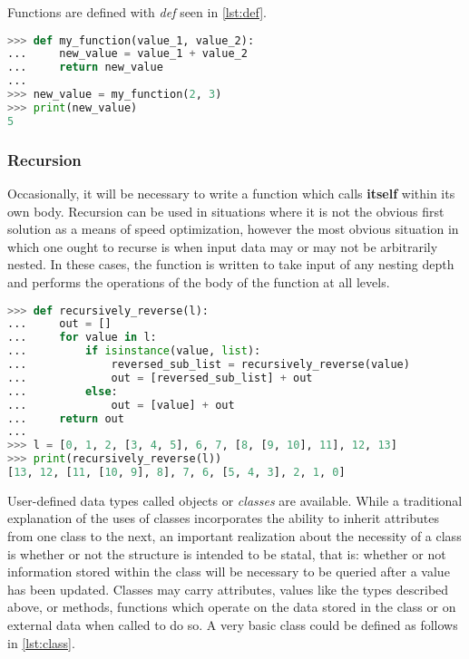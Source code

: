 Functions are defined with \textit{def} seen in \autoref{lst:def}.

\begin{lstlisting}[language=Python,frame=tb,caption={Defining a basic function},label=lst:def]
>>> def my_function(value_1, value_2):
...     new_value = value_1 + value_2
...     return new_value
...
>>> new_value = my_function(2, 3)
>>> print(new_value)
5
\end{lstlisting}

\subsubsection{Recursion}

Occasionally, it will be necessary to write a function which calls \textbf{itself} within its own body. Recursion can be used in situations where it is not the obvious first solution as a means of speed optimization, however the most obvious situation in which one ought to recurse is when input data may or may not be arbitrarily nested. In these cases, the function is written to take input of any nesting depth and performs the operations of the body of the function at all levels.

\begin{lstlisting}[language=Python,frame=tb,caption={An example of recursion},label=lst:recursion]
>>> def recursively_reverse(l):
...     out = []
...     for value in l:
...         if isinstance(value, list):
...             reversed_sub_list = recursively_reverse(value)
...             out = [reversed_sub_list] + out
...         else:
...             out = [value] + out
...     return out
...
>>> l = [0, 1, 2, [3, 4, 5], 6, 7, [8, [9, 10], 11], 12, 13]
>>> print(recursively_reverse(l))
[13, 12, [11, [10, 9], 8], 7, 6, [5, 4, 3], 2, 1, 0]
\end{lstlisting}

User-defined data types called objects or \textit{classes} are available. While a traditional explanation of the uses of classes incorporates the ability to inherit attributes from one class to the next, an important realization about the necessity of a class is whether or not the structure is intended to be statal, that is: whether or not information stored within the class will be necessary to be queried after a value has been updated. Classes may carry attributes, values like the types described above, or methods, functions which operate on the data stored in the class or on external data when called to do so. A very basic class could be defined as follows in \autoref{lst:class}.


